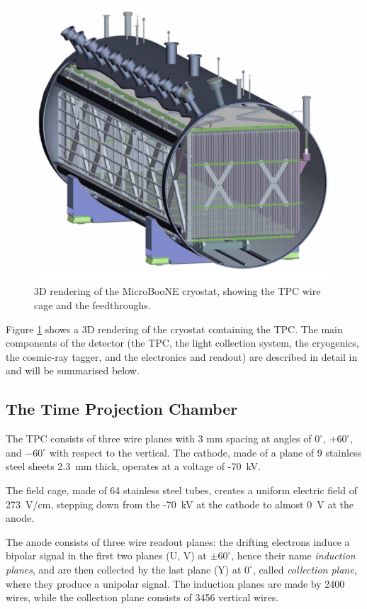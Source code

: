 \begin{figure}[htbp]
    \centering
    \includegraphics[width=0.7\linewidth]{figures/detector.png}
    \caption{3D rendering of the MicroBooNE cryostat, showing the TPC wire cage and the feedthroughs.}
    \label{fig:detector}
\end{figure}

Figure \ref{fig:detector} shows a 3D rendering of the cryostat containing the TPC. The main components of the detector (the TPC, the light collection system, the cryogenics, the cosmic-ray tagger, and the electronics and readout) are described in detail in \cite{Acciarri:2016smi} and will be summarised below. 

\subsection{The Time Projection Chamber}
The TPC consists of three wire planes with 3 mm spacing at angles of $0^{\circ}$, $+60^{\circ}$, and $-60^{\circ}$ with respect to the vertical. The cathode, made of a plane of 9 stainless steel sheets 2.3~mm thick, operates at a voltage of -70~kV.

The field cage, made of 64 stainless steel tubes, creates a uniform electric field of 273~V/cm, stepping down from the -70~kV at the cathode to almost 0~V at the anode. 

The anode consists of three wire readout planes: the drifting electrons induce a bipolar signal in the first two planes (U, V) at $\pm60^{\circ}$, hence their name \emph{induction planes}, and are then collected by the last plane (Y) at $0^{\circ}$, called \emph{collection plane}, where they produce a unipolar signal. The induction planes are made by 2400 wires, while the collection plane consists of 3456 vertical wires. 

